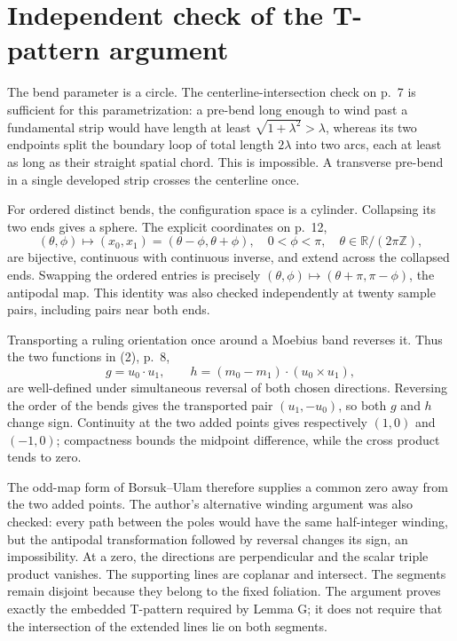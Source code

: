 \documentclass[10pt]{article}
\begin{document}
\section*{Independent check of the T-pattern argument}
The bend parameter is a circle. The centerline-intersection check on p. 7 is sufficient for this parametrization: a pre-bend long enough to wind past a fundamental strip would have length at least \(\sqrt{1+\lambda^2}>\lambda\), whereas its two endpoints split the boundary loop of total length \(2\lambda\) into two arcs, each at least as long as their straight spatial chord. This is impossible. A transverse pre-bend in a single developed strip crosses the centerline once.\par
For ordered distinct bends, the configuration space is a cylinder. Collapsing its two ends gives a sphere. The explicit coordinates on p. 12, \[(\theta,\phi)\longmapsto
       (x_0,x_1)=(\theta-\phi,\theta+\phi),
 \quad 0<\phi<\pi,\quad \theta\in\mathbb R/(2\pi\mathbb Z),\] are bijective, continuous with continuous inverse, and extend across the collapsed ends. Swapping the ordered entries is precisely \((\theta,\phi)\mapsto(\theta+\pi,\pi-\phi)\), the antipodal map. This identity was also checked independently at twenty sample pairs, including pairs near both ends.\par
Transporting a ruling orientation once around a Moebius band reverses it. Thus the two functions in (2), p. 8, \[g=u_0\cdot u_1,\qquad
 h=(m_0-m_1)\cdot(u_0\times u_1),\] are well-defined under simultaneous reversal of both chosen directions. Reversing the order of the bends gives the transported pair \((u_1,-u_0)\), so both \(g\) and \(h\) change sign. Continuity at the two added points gives respectively \((1,0)\) and \((-1,0)\); compactness bounds the midpoint difference, while the cross product tends to zero.\par
The odd-map form of Borsuk–Ulam therefore supplies a common zero away from the two added points. The author’s alternative winding argument was also checked: every path between the poles would have the same half-integer winding, but the antipodal transformation followed by reversal changes its sign, an impossibility. At a zero, the directions are perpendicular and the scalar triple product vanishes. The supporting lines are coplanar and intersect. The segments remain disjoint because they belong to the fixed foliation. The argument proves exactly the embedded T-pattern required by Lemma G; it does not require that the intersection of the extended lines lie on both segments.\par
\end{document}
